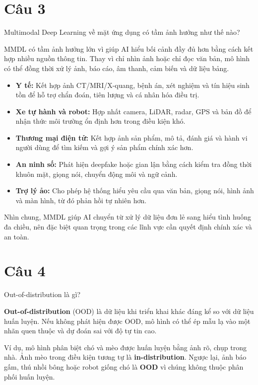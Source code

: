 \section*{Câu 3}
Multimodal Deep Learning về mặt ứng dụng có tầm ảnh hưởng như thế nào?

MMDL có tầm ảnh hưởng lớn vì giúp AI hiểu bối cảnh đầy đủ hơn bằng cách kết hợp nhiều nguồn thông tin. Thay vì chỉ nhìn ảnh hoặc chỉ đọc văn bản, mô hình có thể đồng thời xử lý ảnh, báo cáo, âm thanh, cảm biến và dữ liệu bảng.

\begin{itemize}
    \item \textbf{Y tế:} Kết hợp ảnh CT/MRI/X-quang, bệnh án, xét nghiệm và tín hiệu sinh tồn để hỗ trợ chẩn đoán, tiên lượng và cá nhân hóa điều trị.
    \item \textbf{Xe tự hành và robot:} Hợp nhất camera, LiDAR, radar, GPS và bản đồ để nhận thức môi trường ổn định hơn trong điều kiện khó.
    \item \textbf{Thương mại điện tử:} Kết hợp ảnh sản phẩm, mô tả, đánh giá và hành vi người dùng để tìm kiếm và gợi ý sản phẩm chính xác hơn.
    \item \textbf{An ninh số:} Phát hiện deepfake hoặc gian lận bằng cách kiểm tra đồng thời khuôn mặt, giọng nói, chuyển động môi và ngữ cảnh.
    \item \textbf{Trợ lý ảo:} Cho phép hệ thống hiểu yêu cầu qua văn bản, giọng nói, hình ảnh và màn hình, từ đó phản hồi tự nhiên hơn.
\end{itemize}

Nhìn chung, MMDL giúp AI chuyển từ xử lý dữ liệu đơn lẻ sang hiểu tình huống đa chiều, nên đặc biệt quan trọng trong các lĩnh vực cần quyết định chính xác và an toàn.

\section*{Câu 4}
Out-of-distribution là gì?

\textbf{Out-of-distribution} (OOD) là dữ liệu khi triển khai khác đáng kể so với dữ liệu huấn luyện. Nếu không phát hiện được OOD, mô hình có thể ép mẫu lạ vào một nhãn quen thuộc và dự đoán sai với độ tự tin cao.

Ví dụ, mô hình phân biệt chó và mèo được huấn luyện bằng ảnh rõ, chụp trong nhà. Ảnh mèo trong điều kiện tương tự là \textbf{in-distribution}. Ngược lại, ảnh báo gấm, thú nhồi bông hoặc robot giống chó là \textbf{OOD} vì chúng không thuộc phân phối huấn luyện.

